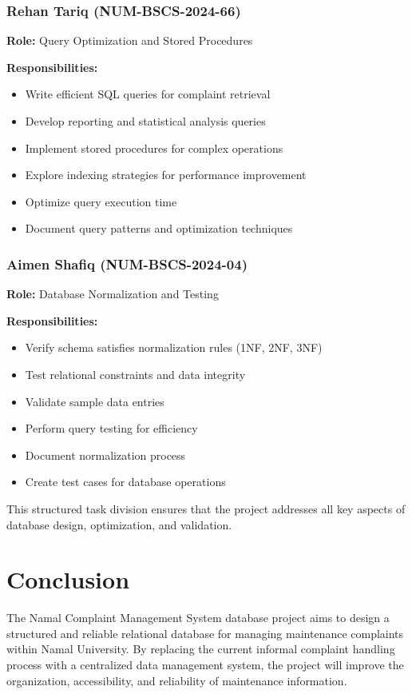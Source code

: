 \documentclass[12pt,a4paper]{article}
\begin{document}
\subsubsection{Rehan Tariq (NUM-BSCS-2024-66)}
\textbf{Role:} Query Optimization and Stored Procedures

\textbf{Responsibilities:}
\begin{itemize}
    \item Write efficient SQL queries for complaint retrieval
    \item Develop reporting and statistical analysis queries
    \item Implement stored procedures for complex operations
    \item Explore indexing strategies for performance improvement
    \item Optimize query execution time
    \item Document query patterns and optimization techniques
\end{itemize}

\subsubsection{Aimen Shafiq (NUM-BSCS-2024-04)}
\textbf{Role:} Database Normalization and Testing

\textbf{Responsibilities:}
\begin{itemize}
    \item Verify schema satisfies normalization rules (1NF, 2NF, 3NF)
    \item Test relational constraints and data integrity
    \item Validate sample data entries
    \item Perform query testing for efficiency
    \item Document normalization process
    \item Create test cases for database operations
\end{itemize}

This structured task division ensures that the project addresses all key aspects of database design, optimization, and validation.

\section{Conclusion}

The Namal Complaint Management System database project aims to design a structured and reliable relational database for managing maintenance complaints within Namal University. By replacing the current informal complaint handling process with a centralized data management system, the project will improve the organization, accessibility, and reliability of maintenance information.
\end{document}

